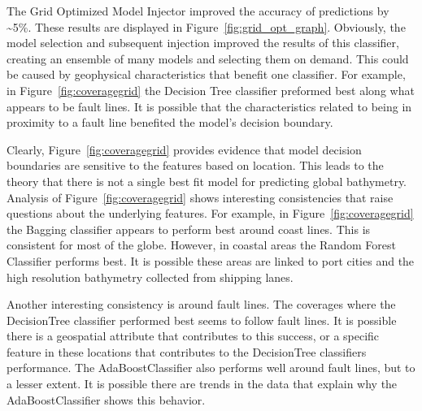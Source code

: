 \par
The Grid Optimized Model Injector improved the accuracy of predictions by \~{}5\%.
These results are displayed in Figure~\ref{fig:grid_opt_graph}.
Obviously, the model selection and subsequent injection improved the results of this classifier, creating an ensemble of many models and selecting them on demand.
This could be caused by geophysical characteristics that benefit one classifier.
For example, in Figure~\ref{fig:coveragegrid} the Decision Tree classifier preformed best along what appears to be fault lines.
It is possible that the characteristics related to being in proximity to a fault line benefited the model's decision boundary. 

\par
Clearly, Figure~\ref{fig:coveragegrid} provides evidence that model decision boundaries are sensitive to the features based on location.
This leads to the theory that there is not a single best fit model for predicting global bathymetry.
Analysis of Figure~\ref{fig:coveragegrid} shows interesting consistencies that raise questions about the underlying features.
For example, in Figure~\ref{fig:coveragegrid} the Bagging classifier appears to perform best around coast lines.
This is consistent for most of the globe.
However, in coastal areas the Random Forest Classifier performs best. 
It is possible these areas are linked to port cities and the high resolution bathymetry collected from shipping lanes.

\par
Another interesting consistency is around fault lines.
The coverages where the DecisionTree classifier performed best seems to follow fault lines.
It is possible there is a geospatial attribute that contributes to this success, or a specific feature in these locations that contributes to the DecisionTree classifiers performance.
The AdaBoostClassifier also performs well around fault lines, but to a lesser extent.
It is possible there are trends in the data that explain why the AdaBoostClassifier shows this behavior.


